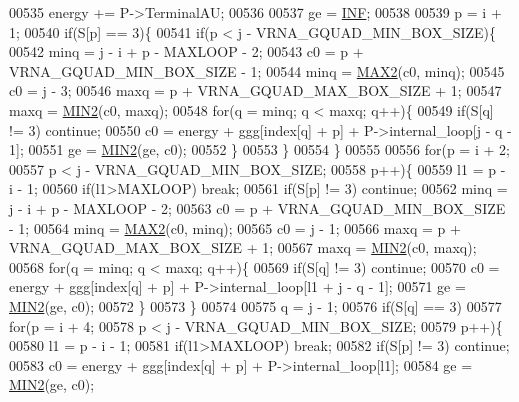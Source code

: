 \begin{DoxyCode}
00535     energy += P->TerminalAU;
00536 
00537   ge = \hyperlink{energy__const_8h_a12c2040f25d8e3a7b9e1c2024c618cb6}{INF};
00538 
00539   p = i + 1;
00540   \textcolor{keywordflow}{if}(S[p] == 3)\{
00541     \textcolor{keywordflow}{if}(p < j - VRNA\_GQUAD\_MIN\_BOX\_SIZE)\{
00542       minq  = j - i + p - MAXLOOP - 2;
00543       c0    = p + VRNA\_GQUAD\_MIN\_BOX\_SIZE - 1;
00544       minq  = \hyperlink{group__utils_ga33297b3679c713b0c4d897cd0fe3b122}{MAX2}(c0, minq);
00545       c0    = j - 3;
00546       maxq  = p + VRNA\_GQUAD\_MAX\_BOX\_SIZE + 1;
00547       maxq  = \hyperlink{group__utils_gae0b9cd0ce090bd69b951aa73e8fa4f7d}{MIN2}(c0, maxq);
00548       \textcolor{keywordflow}{for}(q = minq; q < maxq; q++)\{
00549         \textcolor{keywordflow}{if}(S[q] != 3) \textcolor{keywordflow}{continue};
00550         c0  = energy + ggg[index[q] + p] + P->internal\_loop[j - q - 1];
00551         ge  = \hyperlink{group__utils_gae0b9cd0ce090bd69b951aa73e8fa4f7d}{MIN2}(ge, c0);
00552       \}
00553     \}
00554   \}
00555 
00556   \textcolor{keywordflow}{for}(p = i + 2;
00557       p < j - VRNA\_GQUAD\_MIN\_BOX\_SIZE;
00558       p++)\{
00559     l1    = p - i - 1;
00560     \textcolor{keywordflow}{if}(l1>MAXLOOP) \textcolor{keywordflow}{break};
00561     \textcolor{keywordflow}{if}(S[p] != 3) \textcolor{keywordflow}{continue};
00562     minq  = j - i + p - MAXLOOP - 2;
00563     c0    = p + VRNA\_GQUAD\_MIN\_BOX\_SIZE - 1;
00564     minq  = \hyperlink{group__utils_ga33297b3679c713b0c4d897cd0fe3b122}{MAX2}(c0, minq);
00565     c0    = j - 1;
00566     maxq  = p + VRNA\_GQUAD\_MAX\_BOX\_SIZE + 1;
00567     maxq  = \hyperlink{group__utils_gae0b9cd0ce090bd69b951aa73e8fa4f7d}{MIN2}(c0, maxq);
00568     \textcolor{keywordflow}{for}(q = minq; q < maxq; q++)\{
00569       \textcolor{keywordflow}{if}(S[q] != 3) \textcolor{keywordflow}{continue};
00570       c0  = energy + ggg[index[q] + p] + P->internal\_loop[l1 + j - q - 1];
00571       ge   = \hyperlink{group__utils_gae0b9cd0ce090bd69b951aa73e8fa4f7d}{MIN2}(ge, c0);
00572     \}
00573   \}
00574 
00575   q = j - 1;
00576   \textcolor{keywordflow}{if}(S[q] == 3)
00577     \textcolor{keywordflow}{for}(p = i + 4;
00578         p < j - VRNA\_GQUAD\_MIN\_BOX\_SIZE;
00579         p++)\{
00580       l1    = p - i - 1;
00581       \textcolor{keywordflow}{if}(l1>MAXLOOP) \textcolor{keywordflow}{break};
00582       \textcolor{keywordflow}{if}(S[p] != 3) \textcolor{keywordflow}{continue};
00583       c0  = energy + ggg[index[q] + p] + P->internal\_loop[l1];
00584       ge  = \hyperlink{group__utils_gae0b9cd0ce090bd69b951aa73e8fa4f7d}{MIN2}(ge, c0);

\end{DoxyCode}
